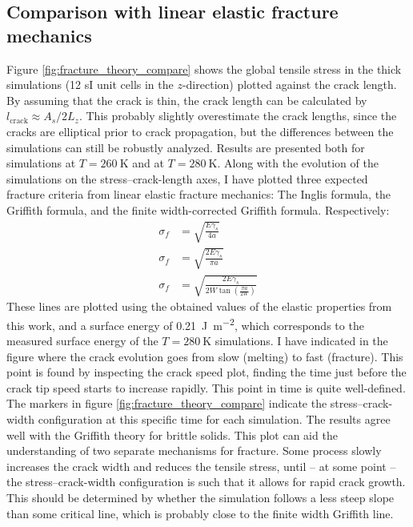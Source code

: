 \subsection{Comparison with linear elastic fracture mechanics}
Figure \ref{fig:fracture_theory_compare} shows the global tensile stress in the thick simulations (12 sI unit cells in the $z$-direction) plotted against the crack length. By assuming that the crack is thin, the crack length can be calculated by $l_{\text{crack}} \approx A_s/2L_z$. This probably slightly overestimate the crack lengths, since the cracks are elliptical prior to crack propagation, but the differences between the simulations can still be robustly analyzed. Results are presented both for simulations at $T= \SI{260}{\kelvin}$ and at $T=\SI{280}{\kelvin}$. Along with the evolution of the simulations on the stress--crack-length axes, I have plotted three expected fracture criteria from linear elastic fracture mechanics: The Inglis formula, the Griffith formula, and the finite width-corrected Griffith formula. Respectively:
\begin{align}
\sigma_f & = \sqrt{\frac{E\gamma_s}{4a}} \\
\sigma_f & = \sqrt{\frac{2E\gamma_s}{\pi a}} \\
\sigma_f & = \sqrt{\frac{2E\gamma_s}{2W\tan\left( \frac{\pi a}{2W}\right)}}
\end{align}
These lines are plotted using the obtained values of the elastic properties from this work, and a surface energy of \SI{0.21}{\joule\per\meter\squared}, which corresponds to the measured surface energy of the $T = \SI{280}{\kelvin}$ simulations. 
 I have indicated in the figure where the crack evolution goes from slow (melting) to fast (fracture). This point is found by inspecting the crack speed plot, finding the time just before the crack tip speed starts to increase rapidly. This point in time is quite well-defined. The markers in figure \ref{fig:fracture_theory_compare} indicate the stress--crack-width configuration at this specific time for each simulation. 
 The results agree well with the Griffith theory for brittle solids. This plot can aid the understanding of two separate mechanisms for fracture. Some process slowly increases the crack width and reduces the tensile stress, until -- at some point -- the stress--crack-width configuration is such that it allows for rapid crack growth. This should be determined by whether the simulation follows a less steep slope than some critical line, which is probably close to the finite width Griffith line. 

